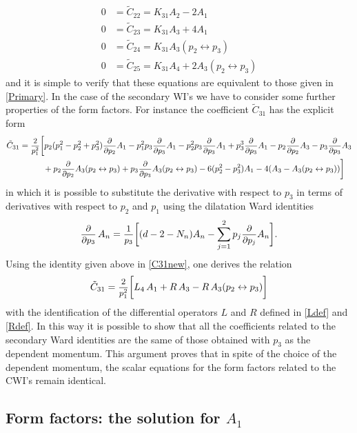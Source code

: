 \documentclass[a4paper,11pt,openright,twoside]{book}
\newcommand{\sdfrac}[2]{\mbox{\small$\displaystyle\frac{#1}{#2}$}}
\numberwithin{equation}{section}
\begin{document}
{{{\begin{equation}
\begin{split}
		0&=\tilde{C}_{22}=K_{31}A_2-2A_1\\
		0&=\tilde{C}_{23}=K_{31}A_3 +4A_1\\
		0&=\tilde{C}_{24}=K_{31}A_3(p_2\leftrightarrow p_3)\\
		0&=\tilde{C}_{25}=K_{31}A_4+2A_3(p_2\leftrightarrow p_3)
	\end{split}
\end{equation}
and it is simple to verify that these equations are equivalent to those given in \eqref{Primary}. 
In the case of the secondary WI's we have to consider some further properties of the form factors. For instance the coefficient $\tilde{C}_{31}$ has the explicit form
\begin{align}
	\tilde{C}_{31}&=\sdfrac{2}{p_1^2}\bigg[p_2(p_1^2-p_2^2+p_3^2)\sdfrac{\partial}{\partial p_2}A_1-p_1^2p_3\sdfrac{\partial}{\partial p_3}A_1-p_2^2p_3\sdfrac{\partial}{\partial p_3}A_1+p_3^3\sdfrac{\partial}{\partial p_3}A_1-p_2\sdfrac{\partial}{\partial p_2}A_3-p_3\sdfrac{\partial}{\partial p_3}A_3\notag\\
	&\hspace{1cm}+p_2\sdfrac{\partial}{\partial p_2}A_3(p_2\leftrightarrow p_3)+p_3\sdfrac{\partial}{\partial p_3}A_3(p_2\leftrightarrow p_3)-6 (p_2^2-p_3^2)A_1-4(A_3-A_3(p_2\leftrightarrow p_3))
	\bigg]\label{C31new}
\end{align}
in which it is possible to substitute the derivative with respect to $p_3$ in terms of derivatives with respect to $p_2$ and $p_1$ using the dilatation Ward identities
\begin{equation}
	\sdfrac{\partial}{\partial p_3}\,A_n=\sdfrac{1}{p_3}\bigg[(d-2-N_n)A_n-\sum_{j=1}^2p_j\sdfrac{\partial}{\partial p_j}A_n\bigg]\label{rel}.
\end{equation}
Using the identity given above in \eqref{C31new}, one derives the relation
\begin{equation}
	\tilde{C}_{31}=\sdfrac{2}{p_1^2}\bigg[L_4\,A_1+R\,A_3-R\,A_3(p_2\leftrightarrow p_3)\bigg]
\end{equation}
with the identification of the differential operators $L$ and $R$ defined in \eqref{Ldef} and \eqref{Rdef}. In this way it is possible to show that all the coefficients related to the secondary Ward identities are the same of those obtained with $p_3$ as the dependent momentum. This argument proves that in spite of the choice of the dependent momentum, the scalar equations for the form factors related to the CWI's remain identical. 

\subsection{Form factors: the solution for $A_1$}

}}}
\end{document}

